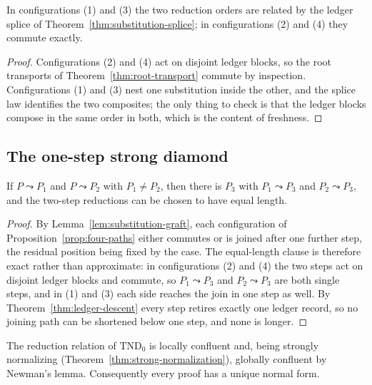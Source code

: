 \begin{lemma}\label{lem:substitution-graft}
In configurations (1) and (3) the two reduction orders are related by the ledger splice of
Theorem~\ref{thm:substitution-splice}; in configurations (2) and (4) they commute exactly.
\end{lemma}

\begin{proof}
Configurations (2) and (4) act on disjoint ledger blocks, so the root transports of
Theorem~\ref{thm:root-transport} commute by inspection.  Configurations (1) and (3) nest
one substitution inside the other, and the splice law identifies the two composites; the
only thing to check is that the ledger blocks compose in the same order in both, which is
the content of freshness.
\end{proof}

\subsection{The one-step strong diamond}

\begin{theorem}\label{thm:strong-diamond}
If $P\leadsto P_1$ and $P\leadsto P_2$ with $P_1\neq P_2$, then there is $P_3$ with
$P_1\leadsto P_3$ and $P_2\leadsto P_3$, and the two-step reductions can be chosen to have
equal length.
\end{theorem}

\begin{proof}
By Lemma~\ref{lem:substitution-graft}, each configuration of
Proposition~\ref{prop:four-paths} either commutes or is joined after one further step, the
residual position being fixed by the case.  The equal-length clause is therefore exact
rather than approximate: in configurations (2) and (4) the two steps act on disjoint ledger
blocks and commute, so $P_1\leadsto P_3$ and $P_2\leadsto P_3$ are both single steps, and
in (1) and (3) each side reaches the join in one step as well.  By
Theorem~\ref{thm:ledger-descent} every step retires exactly one ledger record, so no
joining path can be shortened below one step, and none is longer.
\end{proof}

\begin{corollary}\label{cor:confluence}
The reduction relation of $\mathrm{TND}_0$ is locally confluent and, being strongly
normalizing (Theorem~\ref{thm:strong-normalization}), globally confluent by Newman's
lemma.  Consequently every proof has a unique normal form.
\end{corollary}

